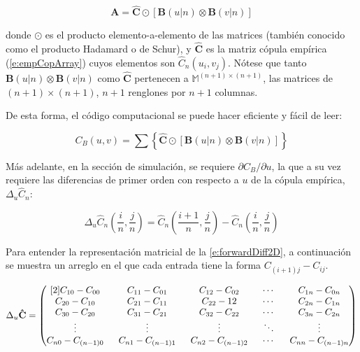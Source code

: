 \begin{equation}
	\mathbf{A}= \hat{\mathbf{C}} \odot [\mathbf{B}(u|n) \otimes \mathbf{B}(v|n)]
\end{equation}

\noindent
donde $\odot$ es el producto elemento-a-elemento de las matrices (tambi\'en conocido como el producto Hadamard o de Schur), y $\hat{\mathbf{C}}$ es la matriz c\'opula emp\'irica (\autoref{e:empCopArray}) cuyos elementos son $\hat{C}_n(u_i,v_j)$. N\'otese que tanto $\mathbf{B}(u|n) \otimes \mathbf{B}(v|n)$ como $\mathbf{\hat{C}}$ pertenecen a $\mathbb{M} ^{(n+1)\times(n+1)}$, las matrices de $(n+1)\times(n+1)$, $n+1$ renglones por $n+1$ columnas.

De esta forma, el c\'odigo computacional se puede hacer eficiente y f\'acil de leer:

\begin{equation}
	C_B(u,v) = \sum \left\{ \mathbf{\hat{C}} \odot [\mathbf{B}(u|n) \otimes \mathbf{B}(v|n)] \right\}
	\label{e:copBernComp}
\end{equation}

M\'as adelante, en la secci\'on de simulaci\'on, se requiere $\partial C_B / \partial u$, la que a su vez requiere las diferencias de primer orden con respecto a $u$ de la c\'opula emp\'irica, $\Delta_u \hat{C}_n$:
	
\begin{equation}
	\Delta_u \hat{C}_n
	\left( \frac{i}{n}, \frac{j}{n} \right)
	= \hat{C}_n
	\left(
		\frac{i+1}{n}, \frac{j}{n}
	\right)
	- \hat{C}_n
	\left(
		\frac{i}{n}, \frac{j}{n}
	\right)
	\label{e:forwardDiff2D}
\end{equation}

Para entender la representaci\'on matricial de la \autoref{e:forwardDiff2D}, a continuaci\'on se muestra un arreglo en el que cada entrada tiene la forma $C_{(i+1)j} - C_{ij}$.

\begin{equation}
\setlength\arraycolsep{8pt}
\Delta_u \mathbf{\hat{C}}=
	\begin{pmatrix}[2]
		C_{10}-C_{00} & C_{11}-C_{01} & C_{12}-C_{02} & \cdots & C_{1n} - C_{0n} \\
		C_{20}-C_{10} & C_{21}-C_{11} & C_{22}-12 & \cdots & C_{2n} - C_{1n} \\ 
		C_{30}-C_{20} & C_{31}-C_{21} & C_{32}-C_{22} & \cdots & C_{3n} - C_{2n} \\ 
		\vdots & \vdots & \vdots & \ddots & \vdots \\
		C_{n0}-C_{(n-1)0} & C_{n1}-C_{(n-1)1} & C_{n2}-C_{(n-1)2} & \cdots & C_{nn} - C_{(n-1)n} \\ 
	\end{pmatrix}
	\label{e:empCopDiffU}
\end{equation}

